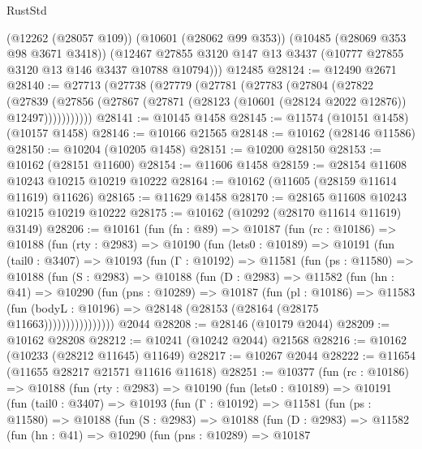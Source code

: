 \begin{lexlean}{RustStd}
\begin{coremodule}
      (@12262 (@28057 @109))
      (@10601 (@28062 @99 @353))
      (@10485 (@28069 @353 @98 @3671 @3418))
      (@12467 @27855 @3120 @147 @13 @3437 (@10777 @27855 @3120 @13 @146 @3437 @10788 @10794)))
    @12485
@28124 := @12490 @2671
@28140 := @27713
    (@27738
      (@27779
        (@27781
          (@27783
            (@27804
              (@27822
                (@27839
                  (@27856 (@27867 (@27871 (@28123 (@10601 (@28124 @2022 @12876)) @12497)))))))))))
@28141 := @10145 @1458
@28145 := @11574 (@10151 @1458) (@10157 @1458)
@28146 := @10166 @21565
@28148 := @10162 (@28146 @11586)
@28150 := @10204 (@10205 @1458)
@28151 := @10200 @28150
@28153 := @10162 (@28151 @11600)
@28154 := @11606 @1458
@28159 := @28154 @11608 @10243 @10215 @10219 @10222
@28164 := @10162 (@11605 (@28159 @11614 @11619) @11626)
@28165 := @11629 @1458
@28170 := @28165 @11608 @10243 @10215 @10219 @10222
@28175 := @10162 (@10292 (@28170 @11614 @11619) @3149)
@28206 := @10161
    (fun (fn : @89) =>
    @10187
      (fun (rc : @10186) =>
      @10188
        (fun (rty : @2983) =>
        @10190
          (fun (lets0 : @10189) =>
          @10191
            (fun (tail0 : @3407) =>
            @10193
              (fun (Γ : @10192) =>
              @11581
                (fun (ps : @11580) =>
                @10188
                  (fun (S : @2983) =>
                  @10188
                    (fun (D : @2983) =>
                    @11582
                      (fun (hn : @41) =>
                      @10290
                        (fun (pns : @10289) =>
                        @10187
                          (fun (pl : @10186) =>
                          @11583
                            (fun (bodyL : @10196) =>
                            @28148 (@28153 (@28164 (@28175 @11663))))))))))))))))
    @2044
@28208 := @28146 (@10179 @2044)
@28209 := @10162 @28208
@28212 := @10241 (@10242 @2044) @21568
@28216 := @10162 (@10233 (@28212 @11645) @11649)
@28217 := @10267 @2044
@28222 := @11654 (@11655 @28217 @21571 @11616 @11618)
@28251 := @10377
    (fun (rc : @10186) =>
    @10188
      (fun (rty : @2983) =>
      @10190
        (fun (lets0 : @10189) =>
        @10191
          (fun (tail0 : @3407) =>
          @10193
            (fun (Γ : @10192) =>
            @11581
              (fun (ps : @11580) =>
              @10188
                (fun (S : @2983) =>
                @10188
                  (fun (D : @2983) =>
                  @11582
                    (fun (hn : @41) =>
                    @10290
                      (fun (pns : @10289) =>
                      @10187

\end{coremodule}
\end{lexlean}
